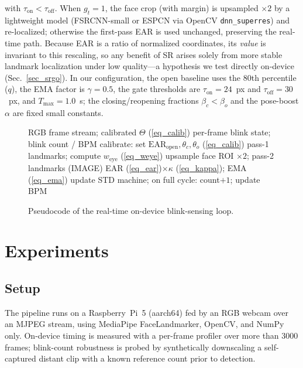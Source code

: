 \documentclass{IEEE_lsens}
\begin{document}
with $\tau_{\text{on}}<\tau_{\text{off}}$. When $g_t=1$, the face crop (with
margin) is upsampled $\times2$ by a lightweight model (FSRCNN-small or ESPCN via
OpenCV \texttt{dnn\_superres}) and re-localized; otherwise the first-pass EAR is
used unchanged, preserving the real-time path. Because EAR is a ratio of
normalized coordinates, its \emph{value} is invariant to this rescaling, so any
benefit of SR arises solely from more stable landmark localization under low
quality---a hypothesis we test directly on-device (Sec.~\ref{sec_srgo}). In our
configuration, the open baseline uses the 80th percentile ($q$), the EMA factor
is $\gamma=0.5$, the gate thresholds are $\tau_{\text{on}}=24$~px and
$\tau_{\text{off}}=30$~px, and $T_{\max}=1.0$~s; the closing/reopening fractions
$\beta_c<\beta_o$ and the pose-boost $\alpha$ are fixed small constants.

\begin{figure}[!t]
\begin{algorithmic}[1]
\renewcommand{\algorithmicrequire}{\textbf{Input:}}
\renewcommand{\algorithmicensure}{\textbf{Output:}}
\REQUIRE RGB frame stream; calibrated $\Theta$ (\ref{eq_calib})
\ENSURE per-frame blink state; blink count / BPM
\STATE calibrate: set $\mathrm{EAR}_{\text{open}},\theta_c,\theta_o$ (\ref{eq_calib})
  \STATE pass-1 landmarks; compute $w_{\text{eye}}$ (\ref{eq_weye})
     \STATE upsample face ROI $\times2$; pass-2 landmarks (IMAGE)
  \ENDIF
  \STATE EAR (\ref{eq_ear})$\times\kappa$ (\ref{eq_kappa}); EMA (\ref{eq_ema})
  \STATE update STD machine; on full cycle: count$+1$; update BPM
\ENDFOR
\end{algorithmic}
\caption{Pseudocode of the real-time on-device blink-sensing loop.}
\label{alg_pipeline}
\end{figure}

\section{Experiments}
\subsection{Setup}
The pipeline runs on a Raspberry~Pi~5 (aarch64) fed by an RGB webcam over an
MJPEG stream, using MediaPipe FaceLandmarker, OpenCV, and NumPy only.
On-device timing is measured with a per-frame profiler over more than 3000
frames; blink-count robustness is probed by synthetically downscaling a
self-captured distant clip with a known reference count prior to detection.
\end{document}
